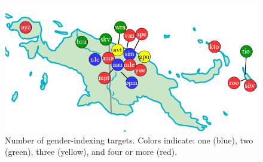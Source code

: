 \documentclass[output=collectionpaper]{langsci/langscibook}
\begin{document}
\begin{figure}
\includegraphics[width=.8\textwidth]{figures/09/Simple/fig5_new.png}
\caption{Number of gender-indexing targets. Colors indicate: one (blue), two (green), three (yellow), and four or more (red).}
\label{fig:Svard:5}
\end{figure}
\end{document}
